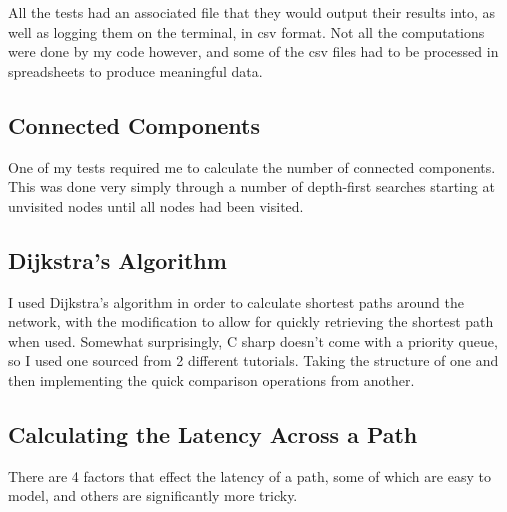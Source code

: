 \documentclass[12pt,a4paper,twoside,openright]{report}
\begin{document}
All the tests had an associated file that they would output their results into, as well as logging them on the terminal, in csv format. Not all the computations were done by my code however, and some of the csv files had to be processed in spreadsheets to produce meaningful data.

\subsection{Connected Components}
One of my tests required me to calculate the number of connected components. This was done very simply through a number of depth-first searches starting at unvisited nodes until all nodes had been visited.

\subsection{Dijkstra's Algorithm}

I used Dijkstra's algorithm in order to calculate shortest paths around the network, with the modification to allow for quickly retrieving the shortest path when used. Somewhat surprisingly, C sharp doesn't come with a priority queue, so I used one sourced from 2 different tutorials. Taking the structure of one and then implementing the quick comparison operations from another.\cite{PriorityQueue1}\cite{PriorityQueue2}

\subsection{Calculating the Latency Across a Path}

There are 4 factors that effect the latency of a path, some of which are easy to model, and others are significantly more tricky.
\end{document}
